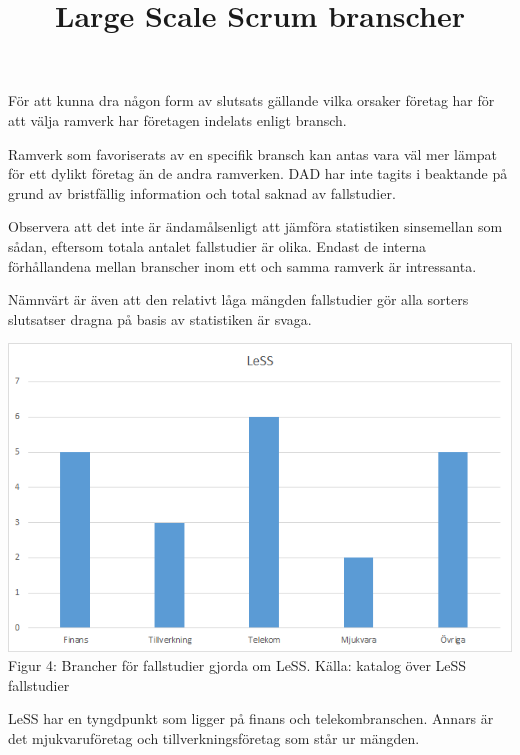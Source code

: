 			För att kunna dra någon form av slutsats gällande vilka orsaker företag har för att välja ramverk har företagen indelats enligt bransch.
					
			Ramverk som favoriserats av en specifik bransch kan antas vara väl mer lämpat för ett dylikt företag än de andra ramverken. DAD har inte tagits i beaktande på grund av bristfällig information och total saknad av fallstudier.
			
			Observera att det inte är ändamålsenligt att jämföra statistiken sinsemellan som sådan, eftersom totala antalet fallstudier är olika. Endast de interna förhållandena mellan branscher inom ett och samma ramverk är intressanta.
				
			Nämnvärt är även att den relativt låga mängden fallstudier gör alla sorters slutsatser dragna på basis av statistiken är svaga.
			
			\title{Large Scale Scrum branscher}
			\begin{center}
				\includegraphics{Grafer/LeSS_brancher.png}
				\\ Figur 4: Brancher för fallstudier gjorda om LeSS. Källa: katalog över LeSS fallstudier \cite{less_casestudies} 
			\end{center}
		
			LeSS har en tyngdpunkt som ligger på finans och telekombranschen. Annars är det mjukvaruföretag och tillverkningsföretag som står ur mängden.\\		
				
